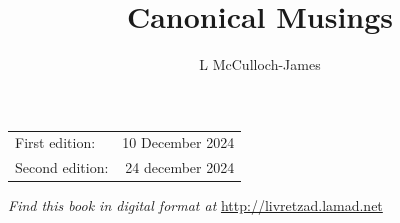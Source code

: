 \documentclass[a5paper,11pt,twoside,onecolumn,openany,extrafontsizes,final]{memoir}%
\title{Canonical Musings}
\author{\Huge L McCulloch-James}
\begin{document}
\pagestyle{empty}
% 
% 
\titleM
\vspace{2\baselineskip}
\vspace{\baselineskip}
\begin{center}
\begin {tabular}{lr}
First edition: & 10 December 2024\\
Second edition: & 24 december 2024\\
\end{tabular}
\end{center}
\vspace{2\baselineskip}
\doclicenseThis
\vspace*{\baselineskip}
\centerline{\textit{Find this book in digital format at
} \url{http://livretzad.lamad.net}} 
\clearpage

\frontmatter
\pagestyle{mystyle}
% 
\clearpage
\tableofcontents*

\mainmatter
\sloppybottom
% 

























\end{document}
